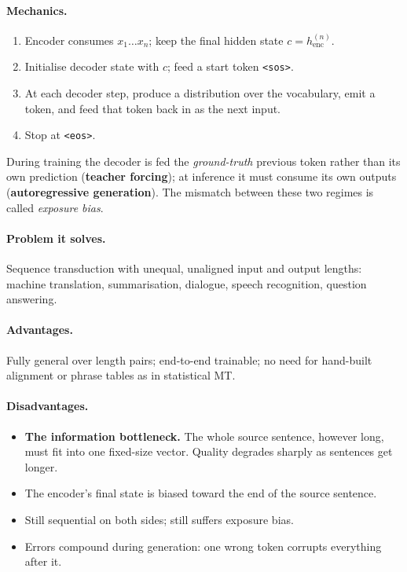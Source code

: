 \documentclass[11pt,a4paper]{article}
\begin{document}
\paragraph{Mechanics.}
\begin{enumerate}
\item Encoder consumes $x_1 \ldots x_n$; keep the final hidden state $c = h^{(n)}_{\text{enc}}$.
\item Initialise decoder state with $c$; feed a start token \texttt{<sos>}.
\item At each decoder step, produce a distribution over the vocabulary, emit a token, and
  feed that token back in as the next input.
\item Stop at \texttt{<eos>}.
\end{enumerate}
During training the decoder is fed the \emph{ground-truth} previous token rather than its
own prediction (\textbf{teacher forcing}); at inference it must consume its own outputs
(\textbf{autoregressive generation}). The mismatch between these two regimes is called
\emph{exposure bias}.

\paragraph{Problem it solves.} Sequence transduction with unequal, unaligned input and
output lengths: machine translation, summarisation, dialogue, speech recognition,
question answering.

\paragraph{Advantages.} Fully general over length pairs; end-to-end trainable; no need for
hand-built alignment or phrase tables as in statistical MT.

\paragraph{Disadvantages.}
\begin{itemize}
\item \textbf{The information bottleneck.} The whole source sentence, however long, must fit
  into one fixed-size vector. Quality degrades sharply as sentences get longer.
\item The encoder's final state is biased toward the end of the source sentence.
\item Still sequential on both sides; still suffers exposure bias.
\item Errors compound during generation: one wrong token corrupts everything after it.
\end{itemize}
\end{document}
